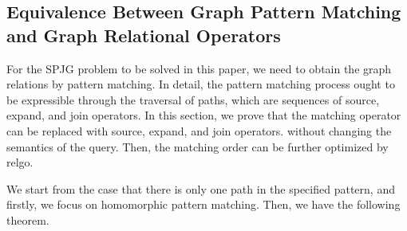 

\iffalse
\subsection{Equivalence Between Graph Pattern Matching and Graph Relational Operators}
\label{sec:proof-gpm-gro}

For the SPJG problem to be solved in this paper, we need to obtain the graph relations by pattern matching.
In detail, the pattern matching process ought to be expressible through the traversal of paths, which are sequences of source, expand, and join operators.
In this section, we prove that the matching operator can be replaced with source, expand, and join operators. without changing the semantics of the query.
Then, the matching order can be further optimized by relgo.

We start from the case that there is only one path in the specified pattern, and firstly, we focus on homomorphic pattern matching.
Then, we have the following theorem.

